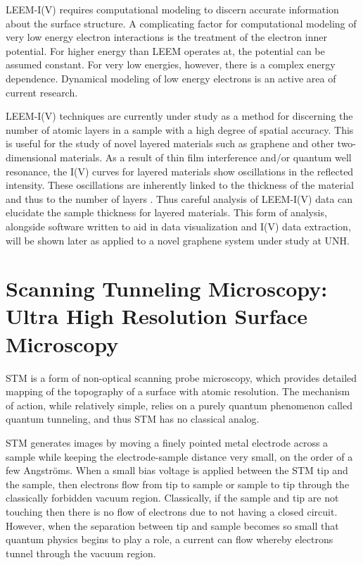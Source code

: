 LEEM-I(V) requires computational modeling to discern accurate information about the surface structure. A complicating factor for computational modeling of very low energy electron interactions is the treatment of the electron inner potential. For higher energy than LEEM operates at, the potential can be assumed constant. For very low energies, however, there is a complex energy dependence. Dynamical modeling of low energy electrons is an active area of current research. 

LEEM-I(V)  techniques are currently under study as a method for discerning the number of atomic layers in a sample with a high degree of spatial accuracy. This is useful for the study of novel layered materials such as graphene and other two-dimensional materials. As a result of thin film interference and/or quantum well resonance, the I(V) curves for layered materials show oscillations in the reflected intensity. These oscillations are inherently linked to the thickness of the material and thus to the number of layers \cite{Hibino}. Thus careful analysis of LEEM-I(V) data can elucidate the sample thickness for layered materials. This form of analysis, alongside software written to aid in data visualization and I(V)  data extraction, will be shown later as applied to a novel graphene system under study at UNH.
	
	
\section{Scanning Tunneling Microscopy: Ultra High Resolution Surface Microscopy}

STM is a form of non-optical scanning probe microscopy, which provides detailed mapping of the topography of a surface with atomic resolution. The mechanism of action, while relatively simple, relies on a purely quantum phenomenon called quantum tunneling, and thus STM has no classical analog. 

STM generates images by moving a finely pointed metal electrode across a sample while keeping the electrode-sample distance very small, on the order of a few Angstr\"oms. When a small bias voltage is applied between the STM tip and the sample, then electrons flow from tip to sample or sample to tip through the classically forbidden vacuum region. Classically, if the sample and tip are not touching then there is no flow of electrons due to not having a closed circuit. However, when the separation between tip and sample becomes so small that quantum physics begins to play a role, a current can flow whereby electrons tunnel through the vacuum region.

